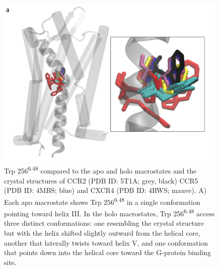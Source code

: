 \begin{figure}[htbp]
\begin{center}
\includegraphics[width=\textwidth]{./figures/trp256.png}
\caption[Analysis of CCR2  conformations]{Trp 256\textsuperscript{6.48} compared to the apo and holo macrostates and the crystal structures of CCR2 (PDB ID: 5T1A; grey, black) CCR5 (PDB ID: 4MBS; blue) and CXCR4 (PDB ID: 4RWS; mauve). A) Each apo macrostate shows Trp 256\textsuperscript{6.48} in a single conformation pointing toward helix III. In the holo macrostates, Trp 256\textsuperscript{6.48} access three distinct conformations: one resembling the crystal structure but with the helix shifted slightly outward from the helical core, another that laterally twists toward helix V, and one conformation that points down into the helical core toward the G-protein binding site.}
\label{fig:trp256}
\end{center}
\end{figure}

